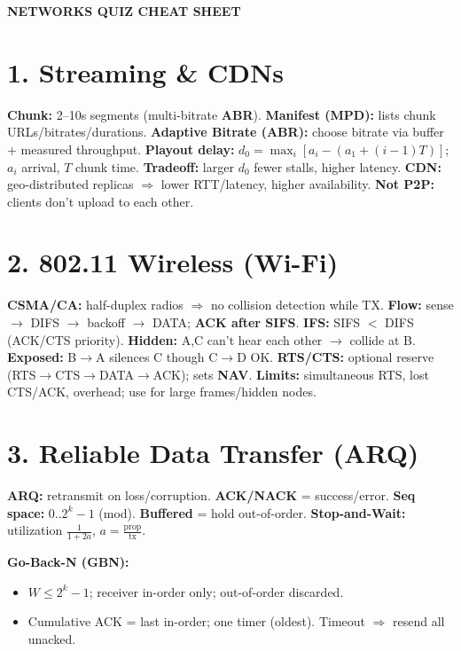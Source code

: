\documentclass[10pt]{article}
\begin{document}
\small
\begin{multicols*}{2}
\raggedright

\textbf{\Large NETWORKS QUIZ CHEAT SHEET}\\[-2pt]
\hrulefill

\section*{1. Streaming \& CDNs}
\textbf{Chunk:} 2–10s segments (multi-bitrate \textbf{ABR}).  
\textbf{Manifest (MPD):} lists chunk URLs/bitrates/durations.  
\textbf{Adaptive Bitrate (ABR):} choose bitrate via buffer + measured throughput.  
\textbf{Playout delay:}\;
$\displaystyle d_0=\max_i[a_i-(a_1+(i-1)T)]$;\; $a_i$ arrival, $T$ chunk time.  
\textbf{Tradeoff:} larger $d_0$ fewer stalls, higher latency.  
\textbf{CDN:} geo-distributed replicas $\Rightarrow$ lower RTT/latency, higher availability.  
\textbf{Not P2P:} clients don’t upload to each other.

\section*{2. 802.11 Wireless (Wi-Fi)}
\textbf{CSMA/CA:} half-duplex radios $\Rightarrow$ no collision detection while TX.  
\textbf{Flow:} sense $\to$ DIFS $\to$ backoff $\to$ DATA; \textbf{ACK after SIFS}.  
\textbf{IFS:} SIFS $<$ DIFS (ACK/CTS priority).  
\textbf{Hidden:} A,C can’t hear each other $\to$ collide at B.  
\textbf{Exposed:} B$\to$A silences C though C$\to$D OK.  
\textbf{RTS/CTS:} optional reserve (RTS$\to$CTS$\to$DATA$\to$ACK); sets \textbf{NAV}.  
\textbf{Limits:} simultaneous RTS, lost CTS/ACK, overhead; use for large frames/hidden nodes.

\section*{3. Reliable Data Transfer (ARQ)}
\textbf{ARQ:} retransmit on loss/corruption. \textbf{ACK/NACK} = success/error.  
\textbf{Seq space:} $0..2^k-1$ (mod). \textbf{Buffered} = hold out-of-order.
\textbf{Stop-and-Wait:} utilization $\tfrac{1}{1+2a}$, $a=\tfrac{\text{prop}}{\text{tx}}$.

\textbf{Go-Back-N (GBN):}
\begin{itemize}\itemsep0pt
\item $W\le 2^k-1$; receiver in-order only; out-of-order discarded.
\item Cumulative ACK = last in-order; one timer (oldest). Timeout $\Rightarrow$ resend all unacked.
\end{itemize}


\end{multicols*}
\end{document}
